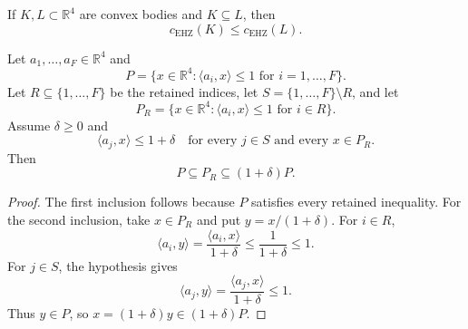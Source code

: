 %

\providecommand{\R}{\mathbb{R}}
\providecommand{\vol}{\operatorname{vol}}
\providecommand{\sys}{\operatorname{sys}}
\providecommand{\conv}{\operatorname{conv}}
\providecommand{\aff}{\operatorname{aff}}

\begin{unverified}
\begin{theorem}\label{thm:ehz-monotonicity}
If $K,L \subset \R^4$ are convex bodies and $K \subseteq L$, then
\[
  c_{\mathrm{EHZ}}(K) \leq c_{\mathrm{EHZ}}(L).
\]
\end{theorem}
\end{unverified}

\begin{unverified}
\begin{lemma}
\label{lem:hrep-facet-removal-containment}
Let $a_1,\ldots,a_F \in \R^4$ and
\[
  P = \{x \in \R^4 : \langle a_i,x\rangle \leq 1
      \text{ for } i=1,\ldots,F\}.
\]
Let $R \subseteq \{1,\ldots,F\}$ be the retained indices, let
$S=\{1,\ldots,F\}\setminus R$, and let
\[
  P_R = \{x \in \R^4 : \langle a_i,x\rangle \leq 1
      \text{ for } i\in R\}.
\]
Assume $\delta \geq 0$ and
\[
  \langle a_j,x\rangle \leq 1+\delta
  \quad\text{for every } j\in S \text{ and every } x\in P_R .
\]
Then
\[
  P \subseteq P_R \subseteq (1+\delta)P .
\]
\end{lemma}
\end{unverified}

\begin{proof}
The first inclusion follows because $P$ satisfies every retained inequality.
For the second inclusion, take $x\in P_R$ and put
$y=x/(1+\delta)$. For $i\in R$,
\[
  \langle a_i,y\rangle
  = \frac{\langle a_i,x\rangle}{1+\delta}
  \leq \frac{1}{1+\delta}
  \leq 1.
\]
For $j\in S$, the hypothesis gives
\[
  \langle a_j,y\rangle
  = \frac{\langle a_j,x\rangle}{1+\delta}
  \leq 1.
\]
Thus $y\in P$, so $x=(1+\delta)y\in (1+\delta)P$.
\end{proof}

